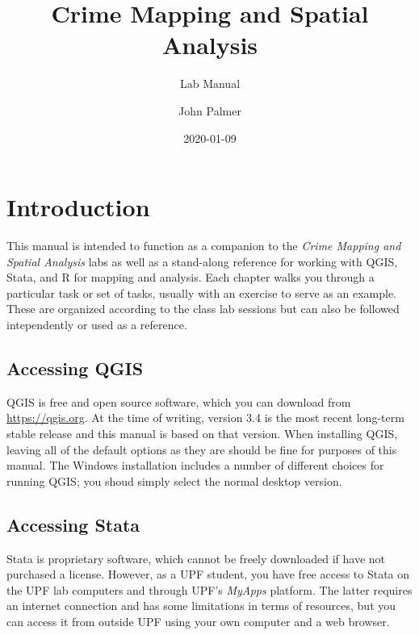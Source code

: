 \documentclass[]{book}
\title{Crime Mapping and Spatial Analysis}
\subtitle{Lab Manual}
\author{John Palmer}
\date{2020-01-09}
\begin{document}
\maketitle

{
\setcounter{tocdepth}{1}
\tableofcontents
}
\hypertarget{introduction}{%
\chapter*{Introduction}\label{introduction}}

This manual is intended to function as a companion to the \emph{Crime Mapping and Spatial Analysis} labs as well as a stand-along reference for working with QGIS, Stata, and R for mapping and analysis. Each chapter walks you through a particular task or set of tasks, usually with an exercise to serve as an example. These are organized according to the class lab sessions but can also be followed intependently or used as a reference.

\hypertarget{accessing-qgis}{%
\section*{Accessing QGIS}\label{accessing-qgis}}

QGIS is free and open source software, which you can download from \url{https://qgis.org}. At the time of writing, version 3.4 is the most recent long-term stable release and this manual is based on that version. When installing QGIS, leaving all of the default options as they are should be fine for purposes of this manual. The Windows installation includes a number of different choices for running QGIS; you shoud simply select the normal desktop version.

\hypertarget{accessing-stata}{%
\section*{Accessing Stata}\label{accessing-stata}}

Stata is proprietary software, which cannot be freely downloaded if have not purchased a license. However, as a UPF student, you have free access to Stata on the UPF lab computers and through UPF's \emph{MyApps} platform. The latter requires an internet connection and has some limitations in terms of resources, but you can access it from outside UPF using your own computer and a web browser.
\end{document}
